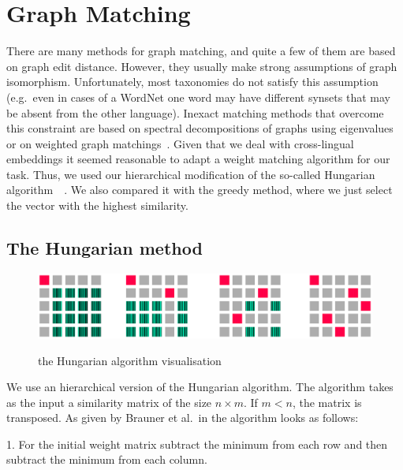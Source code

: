 \documentclass[11pt,a4paper]{article}
\begin{document}
\section{Graph Matching}
There are many methods for graph matching, and quite a few of them are based on graph edit distance. However, they usually make strong assumptions of graph isomorphism. Unfortunately, most taxonomies do not satisfy this assumption (e.g.\ even in cases of a WordNet one word may have different synsets that may be absent from the other language). Inexact matching methods that overcome this constraint are based on spectral decompositions of graphs using eigenvalues or on weighted graph matchings~\cite{30years-graphs}. Given that we deal with cross-lingual embeddings it seemed reasonable to adapt a weight matching algorithm for our task. Thus, we used our hierarchical modification of the so-called Hungarian algorithm~\cite[p.~201]{lawler}~\cite[p.~48]{Riesen2010}. We also compared it with the greedy method, where we just select the vector with the highest similarity.
\subsection{The Hungarian method}
\begin{figure}

	\centering
	\small
	\includegraphics[scale=0.3]{hungarian}\\

	\caption{the Hungarian algorithm visualisation}
	\label{hungarian}
\end{figure}

We use an hierarchical version of the Hungarian algorithm. The algorithm takes as the input a similarity matrix of the size $n \times m$. If $m < n$, the matrix is transposed. As given by Brauner et al.\ in \citeyear{hungarian-listing} the algorithm looks as follows:

1. For the initial weight matrix subtract the minimum from each row and then subtract the minimum from each column.
\end{document}
